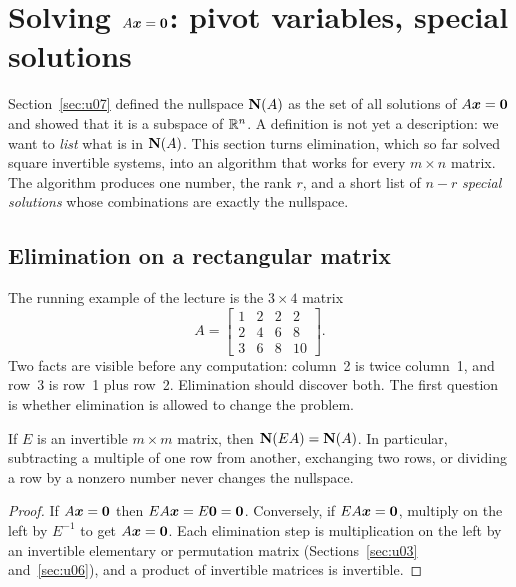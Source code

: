 \section{\texorpdfstring{Solving \(A\boldsymbol{x}=\boldsymbol{0}\): pivot variables, special solutions}{Solving Ax = 0: pivot variables, special solutions}}\label{sec:u08}

Section~\ref{sec:u07} defined the nullspace $\mathbf{N}(A)$ as the set of all solutions of
$A\boldsymbol{x}=\boldsymbol{0}$ and showed that it is a subspace of $\mathbb{R}^n$. A definition is not yet a
description: we want to \emph{list} what is in $\mathbf{N}(A)$. This section turns elimination, which
so far solved square invertible systems, into an algorithm that works for every $m\times n$
matrix. The algorithm produces one number, the rank $r$, and a short list of $n-r$
\emph{special solutions} whose combinations are exactly the nullspace.

\subsection{Elimination on a rectangular matrix}

The running example of the lecture is the $3\times 4$ matrix
\[
A=\begin{bmatrix}1&2&2&2\\2&4&6&8\\3&6&8&10\end{bmatrix}.
\]
Two facts are visible before any computation: column~2 is twice column~1, and row~3 is
row~1 plus row~2. Elimination should discover both. The first question is whether elimination
is allowed to change the problem.

\begin{proposition}\label{prop:u08-same-null}
If $E$ is an invertible $m\times m$ matrix, then $\mathbf{N}(EA)=\mathbf{N}(A)$. In particular, subtracting
a multiple of one row from another, exchanging two rows, or dividing a row by a nonzero number
never changes the nullspace.
\end{proposition}
\begin{proof}
If $A\boldsymbol{x}=\boldsymbol{0}$ then $EA\boldsymbol{x}=E\boldsymbol{0}=\boldsymbol{0}$. Conversely, if $EA\boldsymbol{x}=\boldsymbol{0}$, multiply on
the left by $E^{-1}$ to get $A\boldsymbol{x}=\boldsymbol{0}$. Each elimination step is multiplication on the left
by an invertible elementary or permutation matrix (Sections~\ref{sec:u03} and~\ref{sec:u06}), and
a product of invertible matrices is invertible.
\end{proof}

